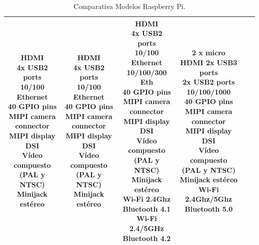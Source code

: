 \begin{landscape}
\begin{table}[]
{\begin{tabular}{|c|c|c|c|c|c|}
\makecell{HDMI\\ 4x USB2 ports\\ 10/100 Ethernet\\ 40 GPIO pins\\ MIPI camera connector\\ MIPI display DSI\\ Vídeo compuesto (PAL y NTSC) \\ Minijack estéreo} & 
\makecell{HDMI\\ 4x USB2 ports\\ 10/100 Ethernet\\ 40 GPIO pins\\ MIPI camera connector\\ MIPI display DSI\\ Vídeo compuesto (PAL y NTSC) \\Minijack estéreo} & 
\makecell{HDMI\\ 4x USB2 ports\\ 10/100 Ethernet\\ 10/100/300 Eth\\ 40 GPIO pins\\ MIPI camera connector\\ MIPI display DSI\\ Vídeo compuesto (PAL y NTSC) \\ Minijack estéreo\\ Wi-Fi 2.4Ghz\\ Bluetooth 4.1\\ Wi-Fi 2.4/5GHz\\ Bluetooth 4.2} & 
\makecell{2 x micro HDMI   2x USB3 ports\\ 2x USB2 ports\\ 10/100/1000\\ 40 GPIO pins\\ MIPI camera connector\\ MIPI display DSI\\ Vídeo compuesto (PAL y NTSC) \\ Minijack estéreo\\ Wi-Fi   2.4Ghz/5Ghz\\ Bluetooth 5.0} \\ \hline
\end{tabular}%
}
\caption{Comparativa Modelos Raspberry Pi.}
\label{tab:comp_RBP}
\end{table}
\end{landscape}


